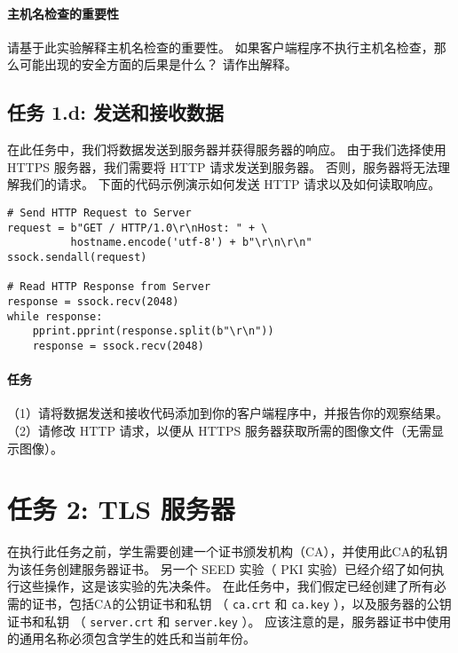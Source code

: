 \paragraph{主机名检查的重要性}
请基于此实验解释主机名检查的重要性。
如果客户端程序不执行主机名检查，那么可能出现的安全方面的后果是什么？
请作出解释。

\subsection{任务 1.d: 发送和接收数据}

在此任务中，我们将数据发送到服务器并获得服务器的响应。
由于我们选择使用 HTTPS 服务器，我们需要将 HTTP 请求发送到服务器。
否则，服务器将无法理解我们的请求。
下面的代码示例演示如何发送 HTTP 请求以及如何读取响应。

\begin{lstlisting}
# Send HTTP Request to Server
request = b"GET / HTTP/1.0\r\nHost: " + \
          hostname.encode('utf-8') + b"\r\n\r\n"
ssock.sendall(request)

# Read HTTP Response from Server
response = ssock.recv(2048)
while response:
    pprint.pprint(response.split(b"\r\n"))
    response = ssock.recv(2048)
\end{lstlisting}


\paragraph{任务}
（1）请将数据发送和接收代码添加到你的客户端程序中，并报告你的观察结果。
（2）请修改 HTTP 请求，以便从 HTTPS 服务器获取所需的图像文件（无需显示图像）。

\section{任务 2: TLS 服务器}

在执行此任务之前，学生需要创建一个证书颁发机构（CA），并使用此CA的私钥为该任务创建服务器证书。
另一个 SEED 实验（ PKI 实验）已经介绍了如何执行这些操作，这是该实验的先决条件。
在此任务中，我们假定已经创建了所有必需的证书，包括CA的公钥证书和私钥
（ \texttt{ca.crt} 和 \texttt{ca.key} ），以及服务器的公钥证书和私钥
（ \texttt{server.crt} 和 \texttt{server.key} ）。
应该注意的是，服务器证书中使用的通用名称必须包含学生的姓氏和当前年份。

